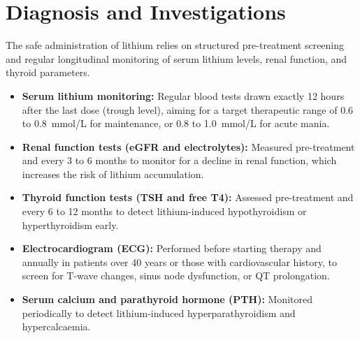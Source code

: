 \section*{Diagnosis and Investigations}
The safe administration of lithium relies on structured pre-treatment screening and regular longitudinal monitoring of serum lithium levels, renal function, and thyroid parameters.
\begin{itemize}
    \item \textbf{Serum lithium monitoring:} Regular blood tests drawn exactly 12 hours after the last dose (trough level), aiming for a target therapeutic range of 0.6 to 0.8~mmol/L for maintenance, or 0.8 to 1.0~mmol/L for acute mania.
    \item \textbf{Renal function tests (eGFR and electrolytes):} Measured pre-treatment and every 3 to 6 months to monitor for a decline in renal function, which increases the risk of lithium accumulation.
    \item \textbf{Thyroid function tests (TSH and free T4):} Assessed pre-treatment and every 6 to 12 months to detect lithium-induced hypothyroidism or hyperthyroidism early.
    \item \textbf{Electrocardiogram (ECG):} Performed before starting therapy and annually in patients over 40 years or those with cardiovascular history, to screen for T-wave changes, sinus node dysfunction, or QT prolongation.
    \item \textbf{Serum calcium and parathyroid hormone (PTH):} Monitored periodically to detect lithium-induced hyperparathyroidism and hypercalcaemia.
\end{itemize}

